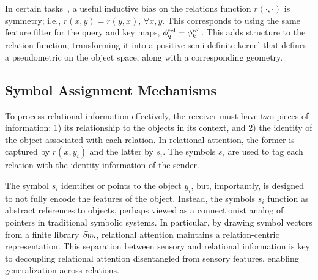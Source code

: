 In certain tasks~\citep{kergNeuralArchitectureInductive2022,altabaa2024abstractors,altabaaLearningHierarchicalRelational2024}, a useful inductive bias on the relations function $r(\cdot, \cdot)$ is symmetry; i.e., $r(x, y) = r(y, x),\, \forall x, y$. This corresponds to using the same feature filter for the query and key maps, $\phi_q^{\mathrm{rel}} = \phi_k^{\mathrm{rel}}$. This adds structure to the relation function, transforming it into a positive semi-definite kernel that defines a pseudometric on the object space, along with a corresponding geometry. %

\subsection{Symbol Assignment Mechanisms}

To process relational information effectively, the receiver must have two pieces of information: 1) its relationship to the objects in its context, and 2) the identity of the object associated with each relation. In relational attention, the former is captured by $r(x, y_i)$ and the latter by $s_i$.
The symbols $s_i$ are used to tag each relation with the identity information of the sender. %

The symbol $s_i$ identifies or points to the object $y_i$, but, importantly, is designed to not fully encode the features of the object.
Instead, the symbols $s_i$ function as abstract references to objects, perhaps viewed as a connectionist analog of pointers in traditional symbolic systems.
In particular, by drawing symbol vectors from a finite library $S_\mathrm{lib}$, relational attention maintains a relation-centric representation.
This separation between sensory and relational information is key to decoupling relational attention disentangled from sensory features, enabling generalization across relations.

